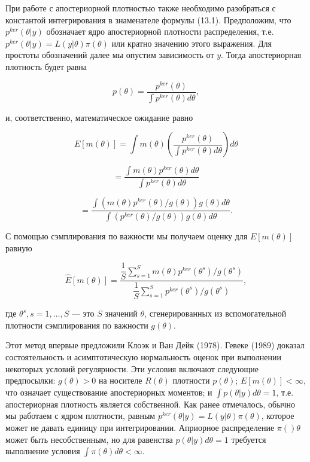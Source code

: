 При работе с апостериорной плотностью также необходимо разобраться с  константой интегрирования в знаменателе формулы (13.1). Предположим, что $p^{ker}(\theta|y)$ обозначает ядро апостериорной плотности распределения, т.е. $p^{ker}(\theta|y)=L(y|\theta)\pi(\theta)$ или кратно значению этого выражения. Для простоты обозначений далее мы опустим зависимость от $y$. Тогда апостериорная плотность будет равна

\[
p(\theta)=\dfrac{p^{ker}(\theta)}{\int{p^{ker}(\theta)d\theta}},
\]

и, соответственно, математическое ожидание равно

\[
E[m(\theta)]=\int{m(\theta)\left(\dfrac{p^{ker}(\theta)}{\int{p^{ker}(\theta)d\theta}}\right)d\theta}
\]

\[
=\frac{\int m(\theta)p^{ker}(\theta)d\theta}{{\int}p^{ker}(\theta)d\theta}
\]

\[
=\dfrac{{\int}(m(\theta)p^{ker}(\theta)/g(\theta))g(\theta)d\theta}{{\int}(p^{ker}(\theta)/g(\theta))g(\theta)d\theta}.
\]

С помощью сэмплирования по важности мы получаем оценку для $E[m(\theta)]$ равную

\begin{equation}
\hat{E}[m(\theta)]=\dfrac{\dfrac{1}{S}\sum^{S}_{s=1}m(\theta)p^{ker}(\theta^s)/g(\theta^s)}{\dfrac{1}{S}\sum^{S}_{s=1} p^{ker}(\theta^s)/g(\theta^s)},
\end{equation}

где $\theta^s, s=1,\ldots ,S$ --- это $S$ значений $\theta$, сгенерированных из вспомогательной плотности сэмплирования по важности $g(\theta)$.

Этот метод впервые предложили Клоэк и Ван Дейк (1978). Гевеке (1989) доказал состоятельность и асимптотическую нормальность оценок при выполнении некоторых условий регулярности. 
Эти условия включают следующие предпосылки: $g(\theta)>0$ на носителе $R(\theta)$ плотности $p(\theta)$; $E[m(\theta)]<\infty$, что означает существование апостериорных моментов; и ${\int}p(\theta|y)d\theta=1$, т.е. апостериорная плотность является собственной. Как ранее отмечалось, обычно мы работаем с ядром  плотности, равным $p^{ker}(\theta|y)=L(y|\theta)\pi(\theta)$, которое может не давать единицу при интегрировании. 
Априорное распределение $\pi()\theta$ может быть несобственным, но для равенства $p(\theta|y)d\theta=1$ требуется выполнение условия ${\int}\pi(\theta)d\theta<\infty$.

